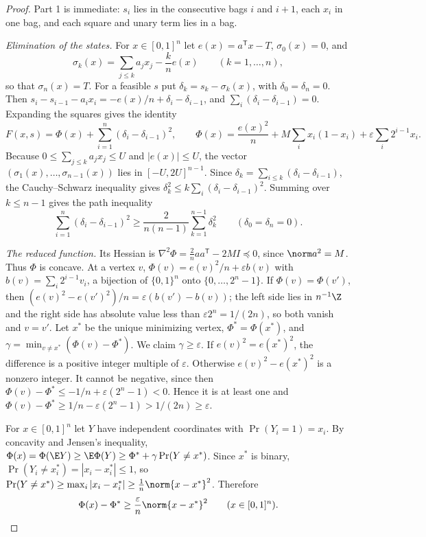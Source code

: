 \begin{proof}
Part 1 is immediate: $s_i$ lies in the consecutive bags $i$ and $i+1$, each
$x_i$ in one bag, and each square and unary term lies in a bag.

\emph{Elimination of the states.} For $x\in[0,1]^n$ let
$e(x)=a^{\mathsf T}x-T$, $\sigma_0(x)=0$, and
\[
\sigma_k(x)=\sum_{j\le k}a_jx_j-\frac kne(x)\qquad(k=1,\ldots,n),
\]
so that $\sigma_n(x)=T$. For a feasible $s$ put $\delta_k=s_k-\sigma_k(x)$,
with $\delta_0=\delta_n=0$. Then
$s_i-s_{i-1}-a_ix_i=-e(x)/n+\delta_i-\delta_{i-1}$, and
$\sum_i(\delta_i-\delta_{i-1})=0$. Expanding the squares gives the identity
\begin{equation}\label{lim:eq:split}
F(x,s)=\Phi(x)+\sum_{i=1}^n(\delta_i-\delta_{i-1})^2,\qquad
\Phi(x)=\frac{e(x)^2}n+M\sum_ix_i(1-x_i)+\varepsilon\sum_i2^{i-1}x_i .
\end{equation}
Because $0\le\sum_{j\le k}a_jx_j\le U$ and $|e(x)|\le U$, the vector
$(\sigma_1(x),\ldots,\sigma_{n-1}(x))$ lies in $[-U,2U]^{n-1}$.
Since $\delta_k=\sum_{i\le k}(\delta_i-\delta_{i-1})$, the Cauchy--Schwarz
inequality gives $\delta_k^2\le k\sum_i(\delta_i-\delta_{i-1})^2$. Summing
over $k\le n-1$ gives the path inequality
\begin{equation}\label{lim:eq:path}
\sum_{i=1}^n(\delta_i-\delta_{i-1})^2\ge\frac2{n(n-1)}\sum_{k=1}^{n-1}
\delta_k^2\qquad(\delta_0=\delta_n=0).
\end{equation}

\emph{The reduced function.} Its Hessian is
$\nabla^2\Phi=\tfrac2naa^{\mathsf T}-2MI\preceq0$, since
$\norm a^2=M$. Thus $\Phi$ is concave. At a vertex $v$,
$\Phi(v)=e(v)^2/n+\varepsilon b(v)$ with $b(v)=\sum_i2^{i-1}v_i$, a
bijection of $\{0,1\}^n$ onto $\{0,\ldots,2^n-1\}$. If $\Phi(v)=\Phi(v')$,
then $(e(v)^2-e(v')^2)/n=\varepsilon(b(v')-b(v))$; the left side lies in
$n^{-1}\Z$ and the right side has absolute value less than
$\varepsilon2^n=1/(2n)$, so both vanish and $v=v'$. Let $x^*$ be the unique
minimizing vertex, $\Phi^*=\Phi(x^*)$, and
$\gamma=\min_{v\ne x^*}(\Phi(v)-\Phi^*)$. We claim $\gamma\ge\varepsilon$.
If $e(v)^2=e(x^*)^2$, the difference is a positive integer multiple of
$\varepsilon$. Otherwise $e(v)^2-e(x^*)^2$ is a nonzero integer. It cannot be
negative, since then $\Phi(v)-\Phi^*\le-1/n+\varepsilon(2^n-1)<0$. Hence it
is at least one and $\Phi(v)-\Phi^*\ge1/n-\varepsilon(2^n-1)>1/(2n)\ge
\varepsilon$.

For $x\in[0,1]^n$ let $Y$ have independent coordinates with
$\Pr(Y_i=1)=x_i$. By concavity and Jensen's inequality,
$\Phi(x)=\Phi(\E Y)\ge\E\Phi(Y)\ge\Phi^*+\gamma\Pr(Y\ne x^*)$. Since $x^*$ is
binary, $\Pr(Y_i\ne x_i^*)=|x_i-x_i^*|\le1$, so
$\Pr(Y\ne x^*)\ge\max_i|x_i-x_i^*|\ge\frac1n\norm{x-x^*}^2$. Therefore
\begin{equation}\label{lim:eq:phigrowth}
\Phi(x)-\Phi^*\ge\frac\varepsilon n\norm{x-x^*}^2\qquad(x\in[0,1]^n).
\end{equation}


\end{proof}
